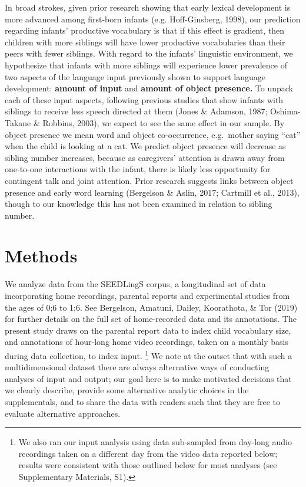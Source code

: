 \documentclass[
  man,mask,floatsintext]{apa6}
\begin{document}
In broad strokes, given prior research showing that early lexical development is more advanced among first-born infants (e.g. Hoff-Ginsberg, 1998), our prediction regarding infants' productive vocabulary is that if this effect is gradient, then children with more siblings will have lower productive vocabularies than their peers with fewer siblings. With regard to the infants' linguistic environment, we hypothesize that infants with more siblings will experience lower prevalence of two aspects of the language input previously shown to support language development: \textbf{amount of input} and \textbf{amount of object presence.} To unpack each of these input aspects, following previous studies that show infants with siblings to receive less speech directed at them (Jones \& Adamson, 1987; Oshima-Takane \& Robbins, 2003), we expect to see the same effect in our sample. By object presence we mean word and object co-occurrence, e.g.~mother saying ``cat'' when the child is looking at a cat. We predict object presence will decrease as sibling number increases, because as caregivers' attention is drawn away from one-to-one interactions with the infant, there is likely less opportunity for contingent talk and joint attention. Prior research suggests links between object presence and early word learning (Bergelson \& Aslin, 2017; Cartmill et al., 2013), though to our knowledge this has not been examined in relation to sibling number.

\hypertarget{methods}{%
\section{Methods}\label{methods}}

We analyze data from the SEEDLingS corpus, a longitudinal set of data incorporating home recordings, parental reports and experimental studies from the ages of 0;6 to 1;6. See Bergelson, Amatuni, Dailey, Koorathota, \& Tor (2019) for further details on the full set of home-recorded data and its annotations. The present study draws on the parental report data to index child vocabulary size, and annotations of hour-long home video recordings, taken on a monthly basis during data collection, to index input. \footnote{We also ran our input analysis using data sub-sampled from day-long audio recordings taken on a different day from the video data reported below; results were consistent with those outlined below for most analyses (see Supplementary Materials, S1).} We note at the outset that with such a multidimensional dataset there are always alternative ways of conducting analyses of input and output; our goal here is to make motivated decisions that we clearly describe, provide some alternative analytic choices in the supplementals, and to share the data with readers such that they are free to evaluate alternative approaches.
\end{document}

